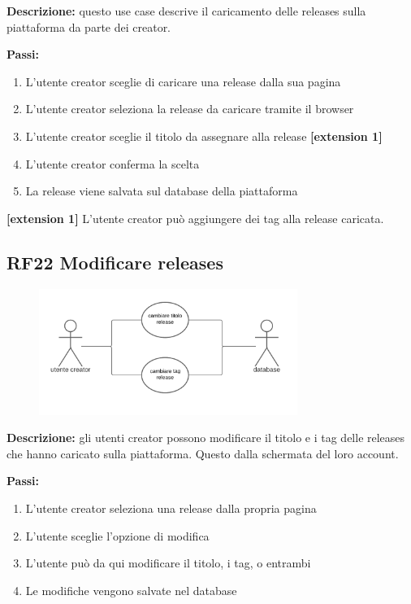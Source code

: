 \documentclass[a4paper,12pt]{article}
\begin{document}
\textbf{Descrizione:} questo use case descrive il caricamento delle releases sulla piattaforma da parte dei creator.

\textbf{Passi:}
\begin{enumerate}
    \item L’utente creator sceglie di caricare una release dalla sua pagina
    \item L’utente creator seleziona la release da caricare tramite il browser
    \item L’utente creator sceglie il titolo da assegnare alla release \textbf{[extension 1]}
    \item L’utente creator conferma la scelta
    \item La release viene salvata sul database della piattaforma
\end{enumerate}
\textbf{[extension 1]} L’utente creator può aggiungere dei tag alla release caricata.

\subsection*{RF22 Modificare releases}

\begin{figure}[htp]
    \centering
    \includegraphics[width=0.75\textwidth]{diagrams/use-case-22.png}
\end{figure}

\textbf{Descrizione:} gli utenti creator possono modificare il titolo e i tag delle releases che hanno caricato sulla piattaforma. Questo dalla schermata del loro account.

\textbf{Passi:}
\begin{enumerate}
    \item L’utente creator seleziona una release dalla propria pagina
    \item L'utente sceglie l’opzione di modifica
    \item L'utente può da qui modificare il titolo, i tag, o entrambi
    \item Le modifiche vengono salvate nel database
    
\end{enumerate}
\end{document}

